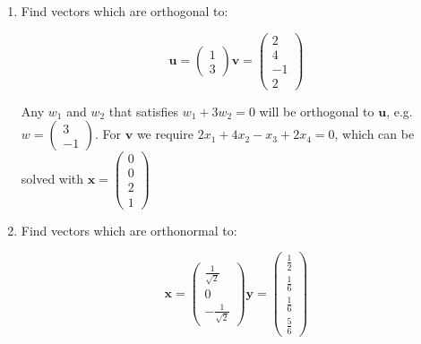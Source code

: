 \documentclass{article}
\begin{document}
\begin{enumerate}
\item Find vectors which are orthogonal to:


\begin{displaymath}
\boldsymbol{u} =  \left( \begin{array}{r} 1 \\ 3 \end{array} \right)
\boldsymbol{v} = \left( \begin{array}{r} 2 \\ 4 \\ -1 \\ 2 \end{array} \right)
\end{displaymath}

Any $w_{1}$ and $w_{2}$ that satisfies $w_{1}+3w_{2}=0$ will be orthogonal to $\boldsymbol{u}$, e.g. $w = \left( \begin{array}{r} 3 \\ -1 \end{array} \right)$.   For $\boldsymbol{v}$ we require $2x_{1} + 4x_{2} - x_{3} + 2x_{4}=0$, which can be solved with $\boldsymbol{x} = \left( \begin{array}{r} 0 \\ 0 \\ 2 \\ 1 \end{array} \right)$

\item Find vectors which are orthonormal to:


\begin{displaymath}
\boldsymbol{x} =  \left( \begin{array}{r} \frac{1}{\sqrt{2}} \\ 0 \\ -\frac{1}{\sqrt{2}} \end{array} \right)
\boldsymbol{y} = \left( \begin{array}{r} \frac{1}{2} \\ \frac{1}{6} \\ \frac{1}{6} \\ \frac{5}{6} \end{array} \right)
\end{displaymath}


\end{enumerate}
\end{document}
